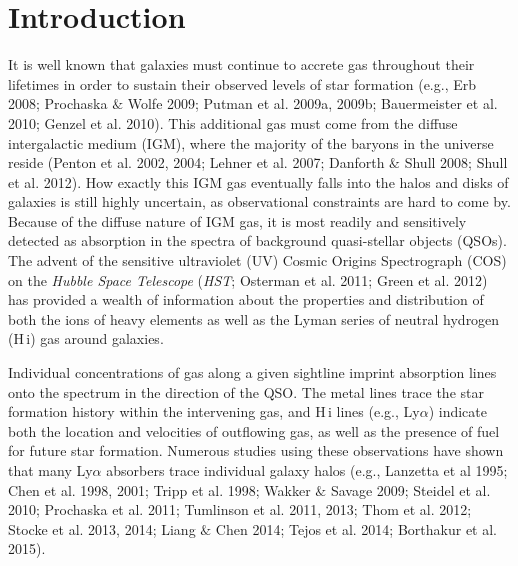 

\section{Introduction}

It is well known that galaxies must continue to accrete gas throughout their lifetimes in order to sustain their observed levels of star formation (e.g., Erb 2008; Prochaska $\&$ Wolfe 2009; Putman et al. 2009a, 2009b; Bauermeister et al. 2010; Genzel et al. 2010). This additional gas must come from the diffuse intergalactic medium (IGM), where the majority of the baryons in the universe reside (Penton et al. 2002, 2004; Lehner et al. 2007; Danforth $\&$ Shull 2008; Shull et al. 2012). How exactly this IGM gas eventually falls into the halos and disks of galaxies is still highly uncertain, as observational constraints are hard to come by. Because of the diffuse nature of IGM gas, it is most readily and sensitively detected as absorption in the spectra of background quasi-stellar objects (QSOs). The advent of the sensitive ultraviolet (UV) Cosmic Origins Spectrograph (COS) on the \textit{Hubble Space Telescope} (\textit{HST}; Osterman et al. 2011; Green et al. 2012) has provided a wealth of information about the properties and distribution of both the ions of heavy elements as well as the Lyman series of neutral hydrogen (H\,{\sc i}) gas around galaxies. 

Individual concentrations of gas along a given sightline imprint absorption lines onto the spectrum in the direction of the QSO. The metal lines trace the star formation history within the intervening gas, and H\,{\sc i} lines (e.g., Ly$\alpha$) indicate both the location and velocities of outflowing gas, as well as the presence of fuel for future star formation. Numerous studies using these observations have shown that many Ly$\alpha$ absorbers trace individual galaxy halos (e.g., Lanzetta et al 1995; Chen et al. 1998, 2001; Tripp et al. 1998; Wakker $\&$ Savage 2009; Steidel et al. 2010; Prochaska et al. 2011; Tumlinson et al. 2011, 2013; Thom et al. 2012;  Stocke et al. 2013, 2014; Liang $\&$ Chen 2014; Tejos et al. 2014; Borthakur et al. 2015).

